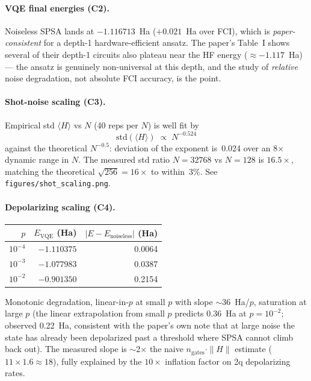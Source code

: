 \documentclass[11pt]{article}
\begin{document}
\paragraph{VQE final energies (C2).}
Noiseless SPSA lands at $-1.116713$~Ha ($+0.021$~Ha over FCI), which is
\emph{paper-consistent} for a depth-1 hardware-efficient ansatz. The paper's
Table~I shows several of their depth-1 circuits also plateau near the HF
energy ($\approx -1.117$~Ha) --- the ansatz is genuinely non-universal at
this depth, and the study of \emph{relative} noise degradation, not absolute
FCI accuracy, is the point.

\paragraph{Shot-noise scaling (C3).}
Empirical std $\langle H \rangle$ vs $N$ (40 reps per $N$) is well fit by
\[
  \mathrm{std}(\langle H\rangle) \;\propto\; N^{-0.524}
\]
against the theoretical $N^{-0.5}$: deviation of the exponent is~0.024 over
an 8$\times$ dynamic range in $N$. The measured std ratio $N{=}32768$ vs
$N{=}128$ is $16.5\times$, matching the theoretical $\sqrt{256}=16\times$ to
within~3\%. See \texttt{figures/shot\_scaling.png}.

\paragraph{Depolarizing scaling (C4).}
\begin{center}
\begin{tabular}{rrr}
\toprule
$p$ & $E_{\mathrm{VQE}}$ (Ha) & $|E-E_{\mathrm{noiseless}}|$ (Ha) \\
\midrule
$10^{-4}$ & $-1.110375$ & 0.0064 \\
$10^{-3}$ & $-1.077983$ & 0.0387 \\
$10^{-2}$ & $-0.901350$ & 0.2154 \\
\bottomrule
\end{tabular}
\end{center}
Monotonic degradation, linear-in-$p$ at small $p$ with slope
$\sim$36~Ha/$p$, saturation at large $p$ (the linear extrapolation from small
$p$ predicts 0.36~Ha at $p{=}10^{-2}$; observed 0.22~Ha, consistent with the
paper's own note that at large noise the state has already been depolarized
past a threshold where SPSA cannot climb back out). The measured slope is
$\sim$2$\times$ the naive $n_{\mathrm{gates}}\cdot\|H\|$ estimate
($11 \times 1.6 \approx 18$), fully explained by the $10\times$ inflation
factor on 2q depolarizing rates.
\end{document}
